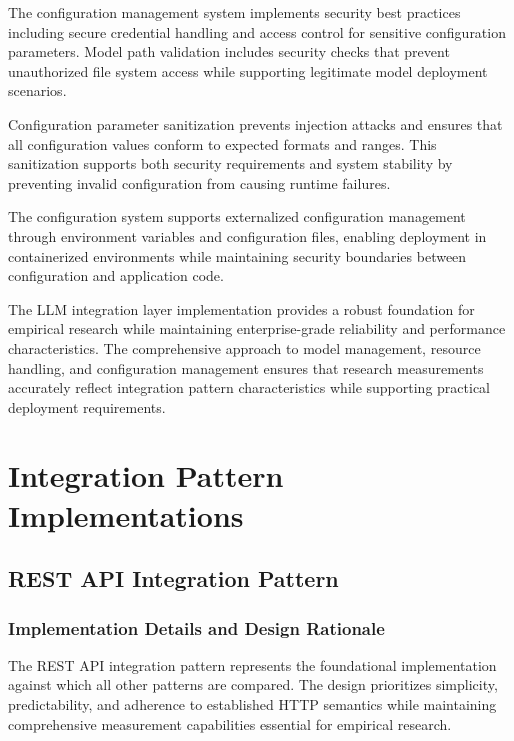 The configuration management system implements security best practices including secure credential handling and access control for sensitive configuration parameters. Model path validation includes security checks that prevent unauthorized file system access while supporting legitimate model deployment scenarios.

Configuration parameter sanitization prevents injection attacks and ensures that all configuration values conform to expected formats and ranges. This sanitization supports both security requirements and system stability by preventing invalid configuration from causing runtime failures.

The configuration system supports externalized configuration management through environment variables and configuration files, enabling deployment in containerized environments while maintaining security boundaries between configuration and application code.


The LLM integration layer implementation provides a robust foundation for empirical research while maintaining enterprise-grade reliability and performance characteristics. The comprehensive approach to model management, resource handling, and configuration management ensures that research measurements accurately reflect integration pattern characteristics while supporting practical deployment requirements.

\chapter{Integration Pattern Implementations}

\section{REST API Integration Pattern}

\subsection{Implementation Details and Design Rationale}

The REST API integration pattern represents the foundational implementation against which all other patterns are compared. The design prioritizes simplicity, predictability, and adherence to established HTTP semantics while maintaining comprehensive measurement capabilities essential for empirical research.

